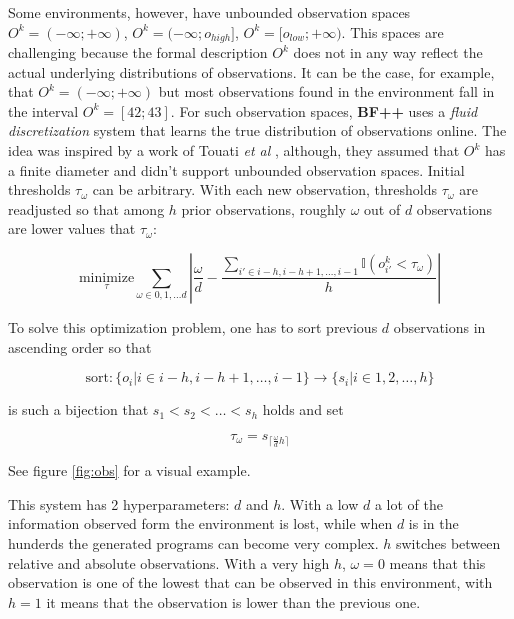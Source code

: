 Some environments, however, have unbounded observation spaces $O^k=(-\infty;+\infty)$, $O^k=(-\infty;o_{high}]$,  $O^k=[o_{low};+\infty)$.
This spaces are challenging because the formal description $O^k$ does not in any way reflect the actual underlying distributions of observations.
It can be the case, for example, that $O^k=(-\infty;+\infty)$ but most observations found in the environment fall in the interval $O^k=[42;43]$.
For such observation spaces, \textbf{BF++} uses a \textit{fluid discretization} system that learns the true distribution of observations online. The idea was inspired by a work of Touati {\sl et al} \cite{adaptivediscretization}, although, they assumed that $O^k$ has a finite diameter and didn't support unbounded observation spaces.
Initial thresholds $\tau_\omega$ can be arbitrary.
With each new observation, thresholds $\tau_\omega$ are readjusted so that among $h$ prior observations, roughly $\omega$ out of $d$  observations are lower values that $\tau_\omega$:

\begin{equation}
\underset{\tau}{\text{minimize}} \sum_{\omega \in 0,1,\dots d} |\frac{\omega}{d} - \frac{\sum_{i' \in i-h,i-h+1,\dots,i-1} \mathbb{I}(o_{i'}^k < \tau_\omega)}{h}|
\end{equation}

To solve this optimization problem, one has to sort previous $d$ observations in ascending order so that 

\begin{equation}
    \text{sort}: \{o_i | i \in i-h,i-h+1,\dots,i-1\} \longrightarrow \{ s_i | i \in 1,2,\dots,h \}
\end{equation}

is such a bijection that $s_1 < s_2 < \dots < s_h$ holds and set

\begin{equation}
    \tau_{\omega} = s_{\lceil \frac{\omega}{d} h \rceil}
\end{equation}

See figure \ref{fig:obs} for a visual example.


This system has 2 hyperparameters: $d$ and $h$.
With a low $d$ a lot of the information observed form the environment is lost, while when $d$ is in the hunderds the generated programs can become very complex.
$h$ switches between relative and absolute observations.
With a very high $h$, $\omega=0$ means that this observation is one of the lowest that can be observed in this environment, with $h=1$ it means that the observation is lower than the previous one.

